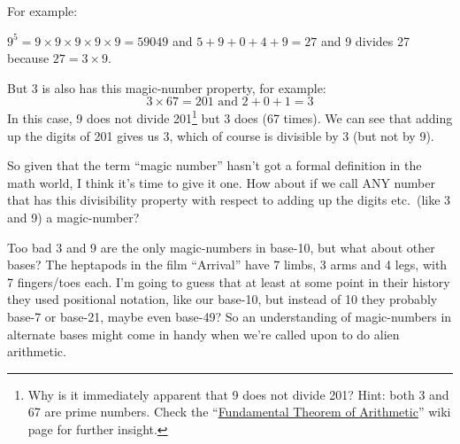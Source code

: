 \documentclass{article}
\newenvironment{jprIn}{\begin{adjustwidth}{2em}{}}{\end{adjustwidth}}
\begin{document}
For example:
\begin{jprIn}
$9^5=9\times{}9\times{}9\times{}9\times{}9=59049$
and $5+9+0+4+9=27$ and 9 divides 27 because $27 = 3\times{}9$.
\end{jprIn}

But 3 is also has this magic-number property, for example:
\[ 3\times{}67=201 \text{ and } 2+0+1=3\]
In this case, 9 does not divide 201\footnote{Why is it immediately
apparent that 9 does not divide 201? Hint: both 3 and 67 are prime numbers.
Check the ``\href{https://en.wikipedia.org/wiki/Fundamental_theorem_of_arithmetic}{Fundamental
Theorem of Arithmetic}'' wiki page for further insight.}
but 3 does (67 times).
We can see that adding up the digits of 201 gives us 3,
which of course is divisible by 3 (but not by 9).

So given that the term ``magic number'' hasn't got
a formal definition in the math world, I think it's time to give it one.
How about if we call ANY number that has this
divisibility property with respect to adding up the digits etc.\ (like 3 and 9) a magic-number?

Too bad 3 and 9 are the only magic-numbers in base-10,
but what about other bases?
The heptapods in the film ``Arrival'' have 7 limbs, 3 arms and 4 legs, with 7 fingers/toes each.
I'm going to guess that at least at some point in their history they used positional
notation, like our base-10, but instead of 10 they probably base-7 or base-21,
maybe even base-49? So an understanding of magic-numbers in alternate
bases might come in handy when we're called upon to do alien arithmetic.
\end{document}
